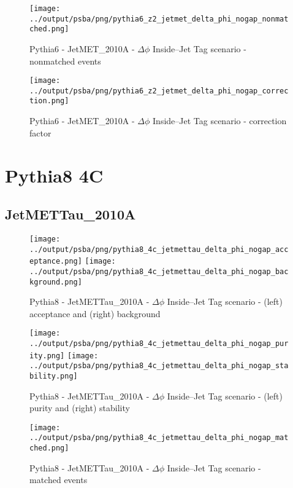 \documentclass[11pt]{book}
\begin{document}
\begin{figure}[ht]
\centering
\texttt{[image: ../output/psba/png/pythia6\_z2\_jetmet\_delta\_phi\_nogap\_nonmatched.png]}
\caption{Pythia6 - JetMET\_2010A - $\Delta\phi$ Inside--Jet Tag scenario - nonmatched events}
\label{fig:p6_jetmet_delta_phi_nogap_nonmatched}
\end{figure}

\begin{figure}[ht]
\centering
\texttt{[image: ../output/psba/png/pythia6\_z2\_jetmet\_delta\_phi\_nogap\_correction.png]}
\caption{Pythia6 - JetMET\_2010A - $\Delta\phi$ Inside--Jet Tag scenario - correction factor}
\label{fig:p6_jetmet_delta_phi_nogap_correction}
\end{figure}


\clearpage

\section{Pythia8 4C}
\subsection{JetMETTau\_2010A}

\begin{figure}[ht]
\centering
\texttt{[image: ../output/psba/png/pythia8\_4c\_jetmettau\_delta\_phi\_nogap\_acceptance.png]}
\texttt{[image: ../output/psba/png/pythia8\_4c\_jetmettau\_delta\_phi\_nogap\_background.png]}
\caption{Pythia8 - JetMETTau\_2010A - $\Delta\phi$ Inside--Jet Tag scenario - (left) acceptance and (right) background}
\label{fig:p8_jetmettau_delta_phi_nogap_ab}
\end{figure}

\begin{figure}[ht]
\centering
\texttt{[image: ../output/psba/png/pythia8\_4c\_jetmettau\_delta\_phi\_nogap\_purity.png]}
\texttt{[image: ../output/psba/png/pythia8\_4c\_jetmettau\_delta\_phi\_nogap\_stability.png]}
\caption{Pythia8 - JetMETTau\_2010A - $\Delta\phi$ Inside--Jet Tag scenario - (left) purity and (right) stability}
\label{fig:p8_jetmettau_delta_phi_nogap_ps}
\end{figure}

\begin{figure}[ht]
\centering
\texttt{[image: ../output/psba/png/pythia8\_4c\_jetmettau\_delta\_phi\_nogap\_matched.png]}
\caption{Pythia8 - JetMETTau\_2010A - $\Delta\phi$ Inside--Jet Tag scenario - matched events}
\label{fig:p8_jetmettau_delta_phi_nogap_matched}
\end{figure}
\end{document}
